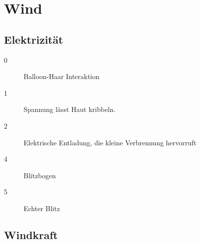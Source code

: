 \documentclass[a4paper,12pt,oneside]{book}
\begin{document}
\chapter{Wind}
\section{Elektrizität}
\begin{description}
\item[0]Balloon-Haar Interaktion
\item[1]Spannung lässt Haut kribbeln.
\item[2]Elektrische Entladung, die kleine Verbrennung hervorruft
\item[4]Blitzbogen
\item[5]Echter Blitz
\end{description}
\section{Windkraft}
\end{document}
